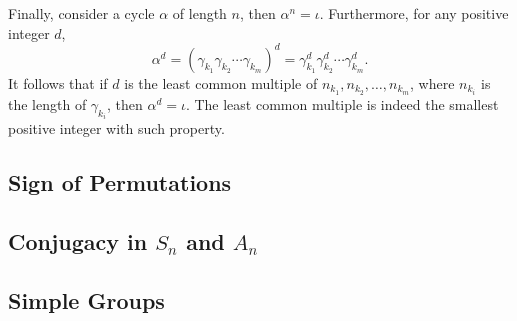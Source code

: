 \documentclass[main.tex]{subfiles}
\begin{document}
				Finally, consider a cycle $\alpha$ of length $n$, then $\alpha^n = \iota$. Furthermore, for any positive integer $d$,
				\begin{equation*}
				\alpha^d = (\gamma_{k_1}\gamma_{k_2}\cdots\gamma_{k_m})^d = \gamma_{k_1}^d\gamma_{k_2}^d\cdots\gamma_{k_m}^d.
				\end{equation*}
				It follows that if $d$ is the least common multiple of $n_{k_1}, n_{k_2}, \ldots, n_{k_m}$, where $n_{k_i}$ is the length of $\gamma_{k_i}$, then $\alpha^d = \iota$. The least common multiple is indeed the smallest positive integer with such property.
			\subsection{Sign of Permutations}
			
			\subsection{Conjugacy in $S_n$ and $A_n$}
			
			\subsection{Simple Groups}
			
\end{document}
